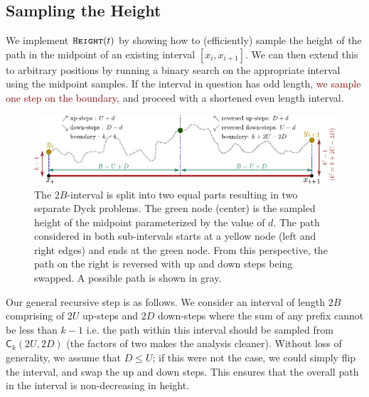 \subsection{Sampling the Height}
\label{sec:sampling_the_height}
We implement $\texttt{\textsc{Height}}(t)$ by showing how to (efficiently) sample the height of the path in the midpoint of an existing interval $[x_i, x_{i+1}]$.
We can then extend this to arbitrary positions by running a binary search on the appropriate interval using the midpoint samples.
If the interval in question has odd length, \textcolor{Maroon}{we sample one step on the boundary}, and proceed with a shortened even length interval.
\begin{figure}[htpb]
    \centering
    \includegraphics[width=\textwidth]{images/dyck_height_sampling.pdf}
    \caption{The $2B$-interval is split into two equal parts resulting in two separate Dyck problems.
             The green node (center) is the sampled height of the midpoint parameterized by the value of $d$.
             The path considered in both sub-intervals starts at a yellow node (left and right edges) and ends at the green node.
             From this perspective, the path on the right is reversed with up and down steps being swapped.
             A possible path is shown in gray.}
    \label{fig:dyck_height_sampling}
\end{figure}

Our general recursive step is as follows.
We consider an interval of length $2B$ comprising of $2U$ up-steps and $2D$ down-steps where the sum of any prefix cannot be less than $k-1$
i.e. the path within this interval should be sampled from $\mathsf C_k(2U,2D)$ (the factors of two makes the analysis cleaner).
Without loss of generality, we assume that $D\le U$; if this were not the case, we could simply flip the interval, and swap the up and down steps.
This ensures that the overall path in the interval is non-decreasing in height.

